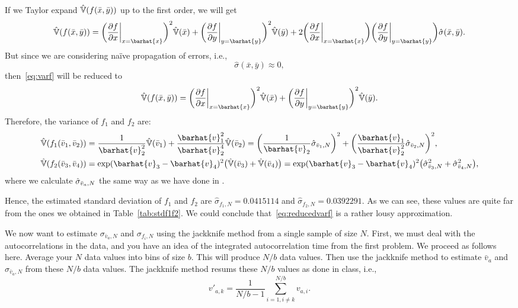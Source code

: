 \Answer{}
If we Taylor expand \(\hat{\mathbb{V}}(f(\bar{x}, \bar{y}))\) up to the first order, we will
get
%
\begin{equation}\label{eq:varf}
    \hat{\Var}(f(\bar{x}, \bar{y})) =
    \biggl(\frac{ \partial f }{ \partial x } \at{x = \barhat{x}}\biggr)^2 \hat{\Var}(\bar{x}) +
    \biggl(\frac{ \partial f }{ \partial y } \at{y = \barhat{y}}\biggr)^2 \hat{\Var}(\bar{y}) +
    2\biggl(\frac{ \partial f }{ \partial x } \at{x = \barhat{x}}\biggr)
    \biggl(\frac{ \partial f }{ \partial y } \at{y = \barhat{y}}\biggr)
    \hat{\sigma}(\bar{x}, \bar{y}).
\end{equation}
%
But since we are considering naïve propagation of errors, i.e.,
%
\begin{equation}
    \hat{\sigma}(\bar{x}, \bar{y}) \approx 0,
\end{equation}
%
then~\eqref{eq:varf} will be reduced to
%
\begin{equation}\label{eq:reducedvarf}
    \hat{\Var}(f(\bar{x}, \bar{y})) =
    \biggl(\frac{ \partial f }{ \partial x } \at{x = \barhat{x}}\biggr)^2 \hat{\Var}(\bar{x}) +
    \biggl(\frac{ \partial f }{ \partial y } \at{y = \barhat{y}}\biggr)^2 \hat{\Var}(\bar{y}).
\end{equation}
%
Therefore, the variance of \(f_1\) and \(f_2\) are:
%
\begin{align}
    \hat{\Var}(f_1(\bar{v}_1, \bar{v}_2)) & =
    \frac{ 1 }{ \barhat{v}^2_2 } \hat{\Var}(\bar{v}_1) +
    \frac{ \barhat{v}^2_1 }{ \barhat{v}^4_2 } \hat{\Var}(\bar{v}_2) =
    \biggl(\frac{ 1 }{ \barhat{v}_2 } \sgbar{1}\biggr)^2 +
    \biggl(\frac{ \barhat{v}_1 }{ \barhat{v}^2_2 } \sgbar{2} \biggr)^2, \\
    \hat{\Var}(f_2(\bar{v}_3, \bar{v}_4)) & =
    \exp( \barhat{v}_3 - \barhat{v}_4 )^2 \bigl(\hat{\Var}(\bar{v}_3) + \hat{\Var}(\bar{v}_4)\bigr) =
    \exp( \barhat{v}_3 - \barhat{v}_4 )^2 \bigl(\sgbar{3}^2 + \sgbar{4}^2\bigr),
\end{align}
%
where we calculate \(\hat{\sigma}_{\bar{v}_a,N}\) the same way as we have done in \label{p1q2}.

Hence, the estimated standard deviation of \(f_1\) and \(f_2\) are
\(\hat{\sigma}_{f_1,N} = 0.0415114\) and \(\hat{\sigma}_{f_2,N} = 0.0392291\).
As we can see, these values are quite far from the ones we obtained in
Table~\ref{tab:stdf1f2}.
We could conclude that~\eqref{eq:reducedvarf} is a rather lousy approximation.


 We now want to estimate \(\sigma_{\bar{v}_a,N}\) and \(\sigma_{f_i,N}\) using
the jackknife method from a single sample of size \(N\).
First, we must deal with the autocorrelations in the data, and you have an idea of the
integrated autocorrelation time from the first problem. We proceed as follows here. Average
your \(N\) data values into bins of size \(b\). This will produce \(N/b\) data values.
Then use the jackknife method to estimate \(\bar{v}_a\) and \(\sigma_{\bar{v}_a,N}\) from
these \(N/b\) data values. The jackknife method resums these \(N/b\) values as done in class,
i.e.,
%
\begin{equation}
    v'_{a,k} = \frac{ 1 }{ N / b - 1 } \sum_{i=1, i \neq k}^{N/b} v_{a,i}.
\end{equation}


